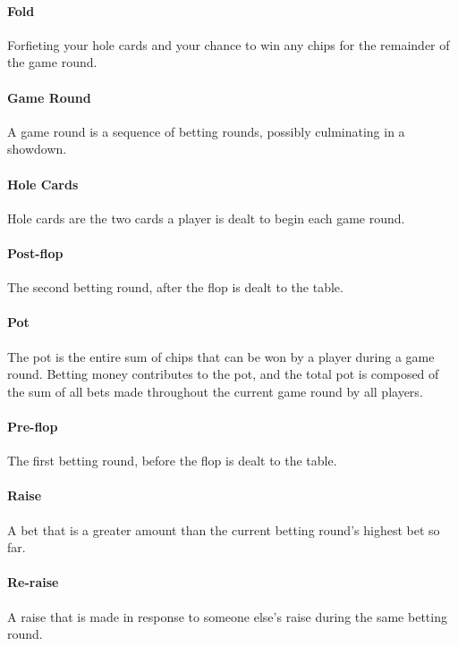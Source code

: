 \paragraph*{Fold} Forfieting your hole cards and your chance to win any chips for the remainder of the game round.

\paragraph*{Game Round} A game round is a sequence of betting rounds, possibly culminating in a showdown.
 
\paragraph*{Hole Cards} Hole cards are the two cards a player is dealt to begin each game round.
 
\paragraph*{Post-flop} The second betting round, after the flop is dealt to the table.

\paragraph*{Pot} The pot is the entire sum of chips that can be won by a player during a game round. Betting money contributes to the pot, and the total pot is composed of the sum of all bets made throughout the current game round by all players.
 
\paragraph*{Pre-flop} The first betting round, before the flop is dealt to the table.
 
\paragraph*{Raise} A bet that is a greater amount than the current betting round's highest bet so far.

\paragraph*{Re-raise} A raise that is made in response to someone else's raise during the same betting round.
 
